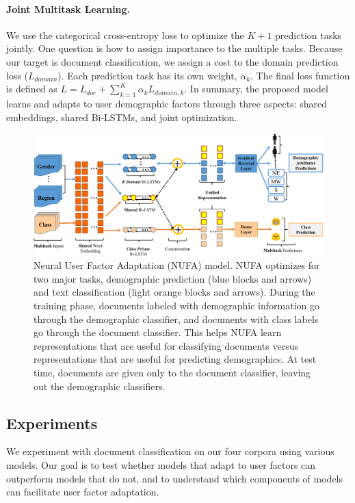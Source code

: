 \paragraph{Joint Multitask Learning.} 
We use the categorical cross-entropy loss to optimize the $K+1$ prediction tasks jointly. One question is how to assign importance to the multiple tasks. Because our target is document classification, we assign a cost to the domain prediction loss ($L_{domain}$). Each prediction task has its own weight, $\alpha_k$. The final loss function is defined as $L = L_{doc} + \sum_{k=1}^K \alpha_k L_{domain, k}$. In summary, the proposed model learns and adapts to user demographic factors through three aspects: shared embeddings, shared Bi-LSTMs, and joint optimization.

\begin{figure}[htp]
\centering
\includegraphics[scale=0.47]{./images/chapter4/model.pdf}
\caption{Neural User Factor Adaptation (NUFA) model. 
NUFA optimizes for two major tasks, demographic prediction (blue blocks and arrows) and text classification (light orange blocks and arrows). 
During the training phase, documents labeled with demographic information go through the demographic classifier, and documents with class labels go through the document classifier. 
This helps NUFA learn representations that are useful for classifying documents versus representations that are useful for predicting demographics.
At test time, documents are given only to the document classifier, leaving out the demographic classifiers. 
}
\label{chap4:fig:model}
\end{figure}

\subsection{Experiments}
\label{chap4:sec:dem_exp}
  
We experiment with document classification on our four corpora using various models. Our goal is to test whether models that adapt to user factors can outperform models that do not, and to understand which components of models can facilitate user factor adaptation.
  
